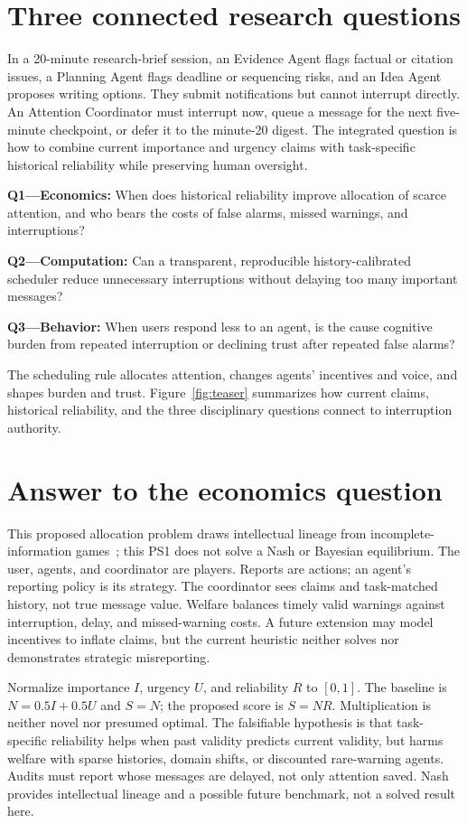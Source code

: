 \section{Three connected research questions}
In a 20-minute research-brief session, an Evidence Agent flags factual or citation issues, a Planning Agent flags deadline or sequencing risks, and an Idea Agent proposes writing options. They submit notifications but cannot interrupt directly. An Attention Coordinator must interrupt now, queue a message for the next five-minute checkpoint, or defer it to the minute-20 digest. The integrated question is how to combine current importance and urgency claims with task-specific historical reliability while preserving human oversight.

\textbf{Q1---Economics:} When does historical reliability improve allocation of scarce attention, and who bears the costs of false alarms, missed warnings, and interruptions?\par
\textbf{Q2---Computation:} Can a transparent, reproducible history-calibrated scheduler reduce unnecessary interruptions without delaying too many important messages?\par
\textbf{Q3---Behavior:} When users respond less to an agent, is the cause cognitive burden from repeated interruption or declining trust after repeated false alarms?

The scheduling rule allocates attention, changes agents' incentives and voice, and shapes burden and trust. Figure~\ref{fig:teaser} summarizes how current claims, historical reliability, and the three disciplinary questions connect to interruption authority.

\section{Answer to the economics question}
This proposed allocation problem draws intellectual lineage from incomplete-information games~\cite{harsanyi1968}; this PS1 does not solve a Nash or Bayesian equilibrium. The user, agents, and coordinator are players. Reports are actions; an agent's reporting policy is its strategy. The coordinator sees claims and task-matched history, not true message value. Welfare balances timely valid warnings against interruption, delay, and missed-warning costs. A future extension may model incentives to inflate claims, but the current heuristic neither solves nor demonstrates strategic misreporting.

Normalize importance $I$, urgency $U$, and reliability $R$ to $[0,1]$. The baseline is $N=0.5I+0.5U$ and $S=N$; the proposed score is $S=NR$. Multiplication is neither novel nor presumed optimal. The falsifiable hypothesis is that task-specific reliability helps when past validity predicts current validity, but harms welfare with sparse histories, domain shifts, or discounted rare-warning agents. Audits must report whose messages are delayed, not only attention saved. Nash~\cite{nash1950} provides intellectual lineage and a possible future benchmark, not a solved result here.

